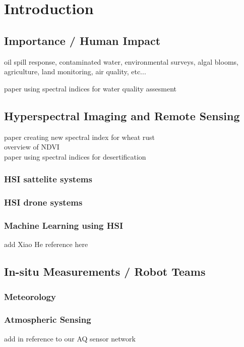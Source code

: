 \documentclass[remotesensing,article,submit,pdftex,moreauthors]{Definitions/mdpi}
\begin{document}
\section{Introduction}

\subsection{Importance / Human Impact}
oil spill response, contaminated water, environmental surveys, algal blooms,
agriculture, land monitoring, air quality, etc...

paper using spectral indices for water quality assesment \cite{SpectralIndexWaterQuality}


\subsection{Hyperspectral Imaging and Remote Sensing}
paper creating new spectral index for wheat rust \cite{SpectralIndexWheat} \\ 
overview of NDVI \cite{SpectralIndexNDVI} \\ 
paper using spectral indices for desertification \cite{SpectralIndexDesertification}


\subsubsection{HSI sattelite systems}
\subsubsection{HSI drone systems}
\subsubsection{Machine Learning using HSI}
add Xiao He reference here \cite{yu2021pm2}

\subsection{In-situ Measurements / Robot Teams}
\subsubsection{Meteorology}
\subsubsection{Atmospheric Sensing}
add in reference to our AQ sensor network
\end{document}
